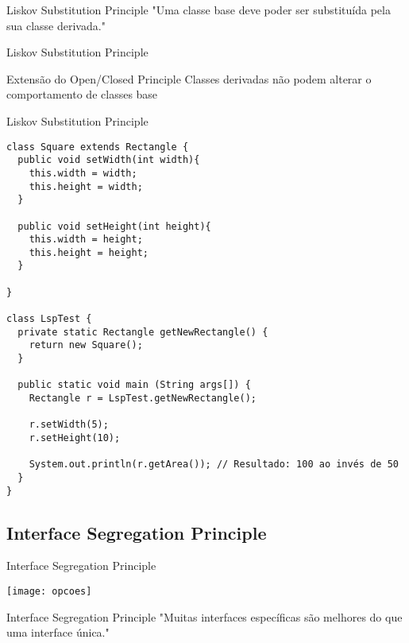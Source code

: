 \documentclass{beamer}
\begin{document}
\begin{frame}{Liskov Substitution Principle}
 "Uma classe base deve poder ser substituída pela sua classe derivada."
\end{frame}

\begin{frame}{Liskov Substitution Principle}
 \begin{outline}
   Extensão do Open/Closed Principle
   Classes derivadas não podem alterar o comportamento de classes base
 \end{outline}
\end{frame}

\begin{frame}[fragile]{Liskov Substitution Principle}
 \begin{verbatim}
class Square extends Rectangle {
  public void setWidth(int width){
    this.width = width;
    this.height = width;
  }

  public void setHeight(int height){
    this.width = height;
    this.height = height;
  }

}

class LspTest {
  private static Rectangle getNewRectangle() {
    return new Square();
  }

  public static void main (String args[]) {
    Rectangle r = LspTest.getNewRectangle();
        
    r.setWidth(5);
    r.setHeight(10);
    
    System.out.println(r.getArea()); // Resultado: 100 ao invés de 50
  }
}
  \end{verbatim}
\end{frame}

\subsection{Interface Segregation Principle}

\begin{frame}{Interface Segregation Principle}
  \begin{center}
    \texttt{[image: opcoes]}
  \end{center}
\end{frame}

\begin{frame}{Interface Segregation Principle}
 "Muitas interfaces específicas são melhores do que uma interface única."
\end{frame}
\end{document}
